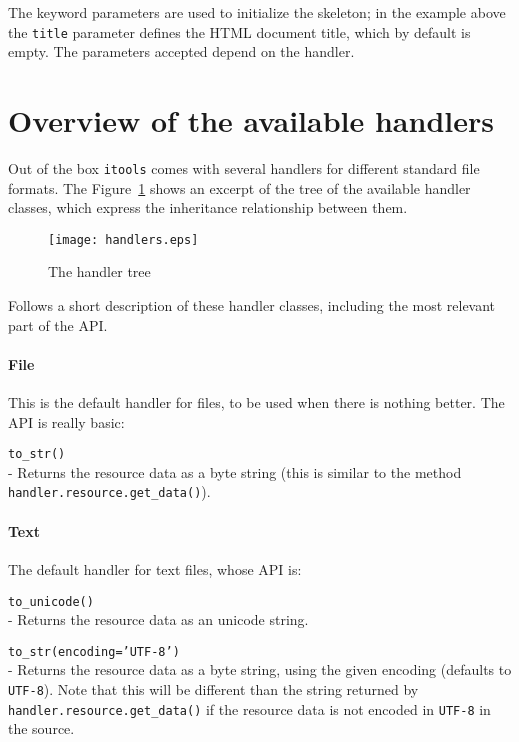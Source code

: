 The keyword parameters are used to initialize the skeleton; in the example
above the {\tt title} parameter defines the HTML document title, which by
default is empty. The parameters accepted depend on the handler.


\section{Overview of the available handlers}

Out of the box {\tt itools} comes with several handlers for different
standard file formats. The Figure~\ref{Figure: handler tree} shows an
excerpt of the tree of the available handler classes, which express the
inheritance relationship between them.

\begin{figure}
  \center
  \texttt{[image: handlers.eps]}
  \caption{The handler tree}
  \label{Figure: handler tree}
\end{figure}

Follows a short description of these handler classes, including the most
relevant part of the API.

\paragraph{File}

This is the default handler for files, to be used when there is nothing
better. The API is really basic:

\begin{api}
  {\tt to\_str()}\\
  - Returns the resource data as a byte string (this is similar to the
    method {\tt handler.resource.get\_data()}).
\end{api}

\paragraph{Text}

The default handler for text files, whose API is:

\begin{api}
  {\tt to\_unicode()}\\
  - Returns the resource data as an unicode string.

  {\tt to\_str(encoding='UTF-8')}\\
  - Returns the resource data as a byte string, using the given encoding
  (defaults to {\tt UTF-8}). Note that this will be different than the
  string returned by {\tt handler.resource.get\_data()} if the resource
  data is not encoded in {\tt UTF-8} in the source.
\end{api}

